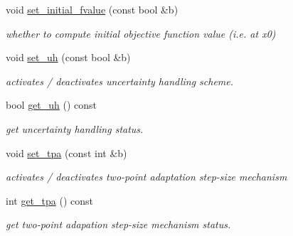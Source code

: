 \begin{DoxyCompactItemize}
void \hyperlink{classlibcmaes_1_1Parameters_af8317ae69be35fdcb2c22c3848b3353f}{set\+\_\+initial\+\_\+fvalue} (const bool \&b)
\begin{DoxyCompactList}\small\item\em whether to compute initial objective function value (i.\+e. at x0) \end{DoxyCompactList}\item 
void \hyperlink{classlibcmaes_1_1Parameters_a40d2b4a06a716a858fc76127c49c66b3}{set\+\_\+uh} (const bool \&b)
\begin{DoxyCompactList}\small\item\em activates / deactivates uncertainty handling scheme. \end{DoxyCompactList}\item 
bool \hyperlink{classlibcmaes_1_1Parameters_a26dbffa26e99e17d7b0dc31bdca23bb2}{get\+\_\+uh} () const 
\begin{DoxyCompactList}\small\item\em get uncertainty handling status. \end{DoxyCompactList}\item 
void \hyperlink{classlibcmaes_1_1Parameters_abdf33ca4024935a04cd4081c411dac85}{set\+\_\+tpa} (const int \&b)
\begin{DoxyCompactList}\small\item\em activates / deactivates two-\/point adaptation step-\/size mechanism \end{DoxyCompactList}\item 
int \hyperlink{classlibcmaes_1_1Parameters_a72622c74df063f5d0f79f674559463e2}{get\+\_\+tpa} () const 
\begin{DoxyCompactList}\small\item\em get two-\/point adapation step-\/size mechanism status. \end{DoxyCompactList}\end{DoxyCompactItemize}
